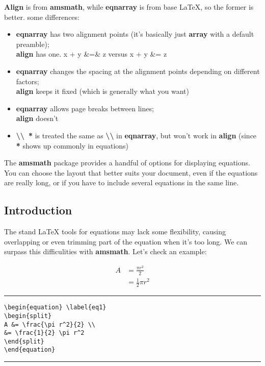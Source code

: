 \textbf{Align} is from \textbf{amsmath}, while \textbf{eqnarray} is from base \LaTeX{}, so the former is better. some differences:

\begin{itemize}
	\item \textbf{eqnarray} has two alignment points (it's basically just \textbf{array} with a default preamble);\\
			\textbf{align} has one. x + y \&=\& z versus x + y \&= z
	\item \textbf{eqnarray} changes the spacing at the alignment points depending on different factors;\\
			\textbf{align} keeps it fixed (which is generally what you want)
	\item \textbf{eqnarray} allows page breaks between lines; \\
			\textbf{align} doesn't
	\item \textbf{\textbackslash \textbackslash~*} is treated the same as \textbf{\textbackslash \textbackslash *} in \textbf{eqnarray}, but won't work in \textbf{align} (since \textbf{*} shows up commonly in equations)
\end{itemize}
The \textbf{amsmath} package provides a handful of options for displaying equations. You can choose the layout that better suits your document, even if the equations are really long, or if you have to include several equations in the same line.

\subsection{Introduction}
The stand \LaTeX{} tools for equations may lack some flexibility, causing overlapping or even trimming part of the equation when it's too long. We can surpass this difficulities with \textbf{amsmath}. Let's check an example:

\begin{equation} \label{eq1}
\begin{split}
A &= \frac{\pi r^2}{2} \\
  &= \frac{1}{2} \pi r^2
\end{split}
\end{equation}

\noindent\vspace{1em}\hrule
\begin{verbatim}
\begin{equation} \label{eq1}
\begin{split}
A &= \frac{\pi r^2}{2} \\
&= \frac{1}{2} \pi r^2
\end{split}
\end{equation}
\end{verbatim}
\noindent\hrule\vspace{1em}

